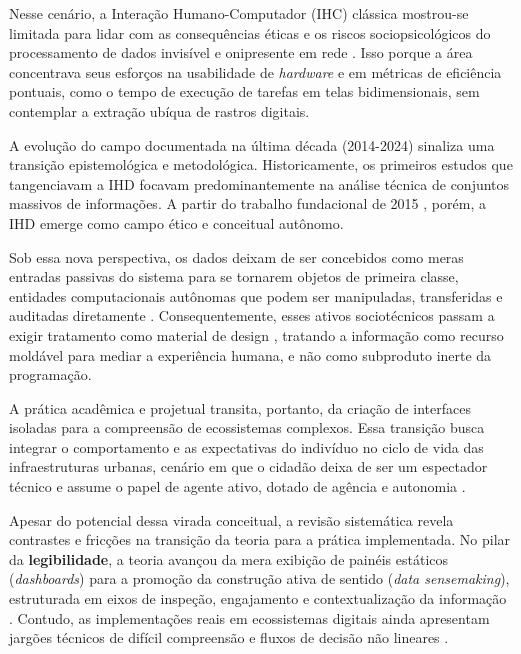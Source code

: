 \documentclass[12pt]{article}
\begin{document}
    Nesse cenário, a Interação Humano-Computador (IHC) clássica mostrou-se limitada para lidar com as consequências éticas e os riscos sociopsicológicos do processamento de dados invisível e onipresente em rede \cite{Parviainen2016, Calvetti2021173}. Isso porque a área concentrava seus esforços na usabilidade de \textit{hardware} e em métricas de eficiência pontuais, como o tempo de execução de tarefas em telas bidimensionais, sem contemplar a extração ubíqua de rastros digitais.

     A evolução do campo documentada na última década (2014-2024) sinaliza uma transição epistemológica e metodológica. Historicamente, os primeiros estudos que tangenciavam a IHD focavam predominantemente na análise técnica de conjuntos massivos de informações\cite{Parviainen2016, Meireles2016, Hornung2015}. A partir do trabalho fundacional de 2015 \cite{mortier2015humandatainteractionhumanface}, porém, a IHD emerge como campo ético e conceitual autônomo.

    Sob essa nova perspectiva, os dados deixam de ser concebidos como meras entradas passivas do sistema para se tornarem objetos de primeira classe, entidades computacionais autônomas que podem ser manipuladas, transferidas e auditadas diretamente \cite{Crabtree2016}. Consequentemente, esses ativos sociotécnicos passam a exigir tratamento como material de design \cite{seidelin2020foregrounding}, tratando a informação como recurso moldável para mediar a experiência humana, e não como subproduto inerte da programação.

    A prática acadêmica e projetual transita, portanto, da criação de interfaces isoladas para a compreensão de ecossistemas complexos. Essa transição busca integrar o comportamento e as expectativas do indivíduo no ciclo de vida das infraestruturas urbanas, cenário em que o cidadão deixa de ser um espectador técnico e assume o papel de agente ativo, dotado de agência e autonomia \cite{Sailaja2021Designing, bavaresco2019technological}.

    Apesar do potencial dessa virada conceitual, a revisão sistemática revela contrastes e fricções na transição da teoria para a prática implementada. No pilar da \textbf{legibilidade}, a teoria avançou da mera exibição de painéis estáticos (\textit{dashboards}) para a promoção da construção ativa de sentido (\textit{data sensemaking}), estruturada em eixos de inspeção, engajamento e contextualização da informação \cite{Koesten2021}. Contudo, as implementações reais em ecossistemas digitais ainda apresentam jargões técnicos de difícil compreensão e fluxos de decisão não lineares \cite{Sailaja2021}.
\end{document}
